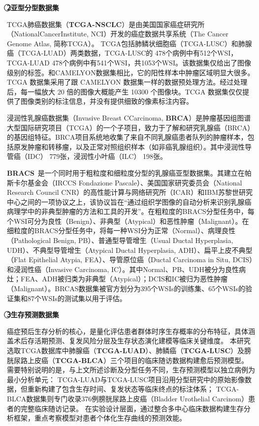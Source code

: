 \textbf{\textcircled{2}亚型分型数据集}

TCGA肺癌数据集（\textbf{TCGA-NSCLC}）是由美国国家癌症研究所（NationalCancerInstitute, NCI）开发的癌症数据共享系统（The Cancer Genome Atlas, 简称TCGA）。
TCGA包括肺鳞状细胞癌（TCGA-LUSC）和肺腺癌（TCGA-LUAD）两类数据，TCGA-LUSC的 478个病例中有512个WSI，
TCGA-LUAD 478个病例中有541个WSI，共1053个WSI。该数据集仅给出了图像级别的标签。和CAMELYON数据集相比，它的阳性样本中肿瘤区域明显大很多。
TCGA 数据集采用了跟 CAMELYON 数据集一样的数据预处理方法。经过处理后，每一幅放大 20 倍的图像大概能产生 10300 个图像块。TCGA 数据集仅仅提供了图像类别的标注信息，并没有提供细致的像素标注内容。

浸润性乳腺癌数据集（Invasive Breast CCarcinoma, \textbf{BRCA}）是肿瘤基因组图谱大型国际研究项目（TCGA）的一个子项目，致力于了解和研究乳腺癌（BRCA）的基因组特征。BRCA项目系统地收集了来自不同乳腺癌患者队列的肿瘤样本，包括原发肿瘤和转移瘤，以及正常对照组织样本（如非癌乳腺组织）。其中浸润性导管癌（IDC） 779张，浸润性小叶癌（ILC） 198张。

\textbf{BRACS}~\cite{brancati2022bracs}是一个同时用于粗粒度和细粒度分型的乳腺癌亚型数据集。其建立在帕斯卡尔基金会（IRCCS Fondazione Pascale）、美国国家研究委员会（National Research Council CNR）的高性能计算与网络研究所（ICAR）和IBM苏黎世研究中心之间的一项协议之上，该协议旨在“通过组织学图像的自动分析来识别乳腺癌病理学中的非典型肿瘤的方法和工具的开发”。在粗粒度的BRACS分型任务中，每个WSI可分为良性（Benign）、非典型（Atypical）和恶性肿瘤（Malignant）。在细粒度的BRACS分型任务中，将每一种WSI分为正常（Normal）、病理良性（Pathological Benign, PB）、普通型导管增生（Usual Ductal Hyperplasia, UDH）、不典型导管增生（Atypical Ductal Hyperplasia, ADH）、扁平上皮不典型（Flat Epithelial Atypia, FEA）、导管原位癌（Ductal Carcinoma in Situ, DCIS）和浸润性癌（Invasive Carcinoma, IC）。其中Normal、PB、UDH被分为良性病灶；FEA、ADH被归类为非典型（Atypical）；DCIS和IC被归为恶性肿瘤（Malignant）。BRCAS数据集被官方划分为395个WSIs的训练集、65个WSIs的验证集和87个WSIs的测试集以用于评估。

\textbf{\textcircled{3}生存预测数据集}

癌症预后生存分析的核心，是量化评估患者群体时序生存概率的分布特征，具体涵盖术后存活期预测、复发风险分层及生存状态演化建模等临床关键维度。
本研究选取TCGA数据库中肺腺癌（\textbf{TCGA-LUAD}）、肺鳞癌（\textbf{TCGA-LUSC}）及膀胱尿路上皮癌（\textbf{TCGA-BLCA}）三个项目的临床随访数据构建愈后预测模型。
需要特别说明的是，与上文所述诊断及分型任务不同，生存预测模型以独立病例为最小分析单元：
TCGA-LUAD与TCGA-LUSC项目沿用分型研究中的原始影像数据，但重新构建了包含生存时间、复发状态等临床终点的标注体系；
TCGA-BLCA数据集则专门收录376例膀胱尿路上皮癌（Bladder Urothelial Carcinom）患者的完整临床随访记录。
在实验设计层面，通过整合多中心临床数据构建生存分析框架，重点考察模型对患者个体化生存曲线的预测效能。

